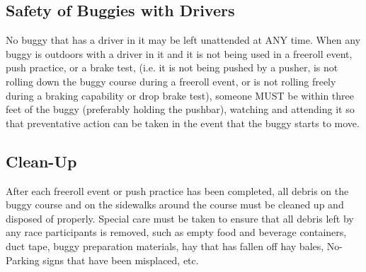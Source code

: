 \subsection{Safety of Buggies with Drivers}
\label{ssec:SafetyBuggyDriver}
	No buggy that has a driver in it may be left unattended at ANY time. When any
	buggy is outdoors with a driver in it and it is not being used in a freeroll
	event, push practice, or a brake test, (i.e. it is not being pushed by a pusher,
	is not rolling down the buggy course during a freeroll event, or is
	not rolling freely during a braking capability or drop brake test), someone MUST
	be within three feet of the buggy (preferably holding the pushbar), watching and
	attending it so that preventative action can be taken in the event that the
	buggy starts to move.


\subsection{Clean-Up}
\label{ssec:CleanUp}
	After each freeroll event or push practice has been completed, all debris
	on the buggy course and on the sidewalks around the course must be cleaned up
	and disposed of properly. Special care must be taken to ensure that all debris
	left by any race participants is removed, such as empty food and beverage
	containers, duct tape, buggy preparation materials, hay that has fallen off hay
	bales, No-Parking signs that have been misplaced, etc.

